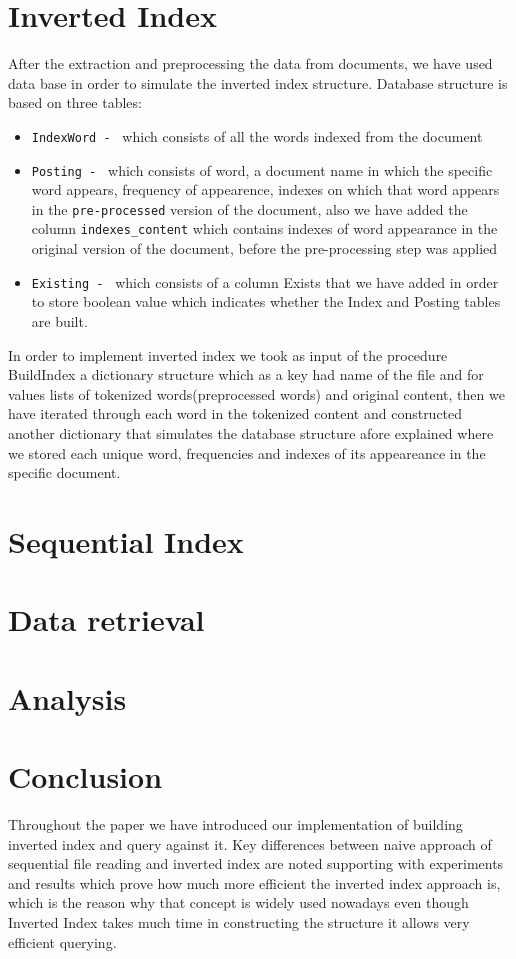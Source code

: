\documentclass{article}
\begin{document}
\section{Inverted Index}
After the extraction and preprocessing the data from documents, we have used data base in order to simulate the inverted index structure. Database structure is based on three tables:
\begin{itemize}
    \item \texttt{IndexWord - } which consists of all the words indexed from the document 
    \item \texttt{Posting - } which consists of word, a document name in which the specific word appears, frequency of appearence, indexes on which that word appears in the \texttt{pre-processed} version of the document, also we have added the column \texttt{indexes\_content} which contains indexes of word appearance in the original version of the document, before the pre-processing step was applied
    \item \texttt{Existing - } which consists of a column Exists that we have added in order to store boolean value which indicates whether the Index and Posting tables are built. 
\end{itemize}
In order to implement inverted index we took as input of the procedure BuildIndex a dictionary structure which as a key had name of the file and for values lists of tokenized words(preprocessed words) and original content, then we have iterated through each word in the tokenized content and constructed another dictionary that simulates the database structure afore explained where we stored each unique word, frequencies and indexes of its appeareance in the specific document.

\section{Sequential Index}

\section{Data retrieval}

\section{Analysis}

\section{Conclusion}
Throughout the paper we have introduced our implementation of building inverted index and query against it. Key differences between naive approach of sequential file reading and inverted index are noted supporting with experiments and results which prove how much more efficient the inverted index approach is, which is the reason why that concept is widely used nowadays even though Inverted Index takes much time in constructing the structure it allows very efficient querying.
\end{document}
